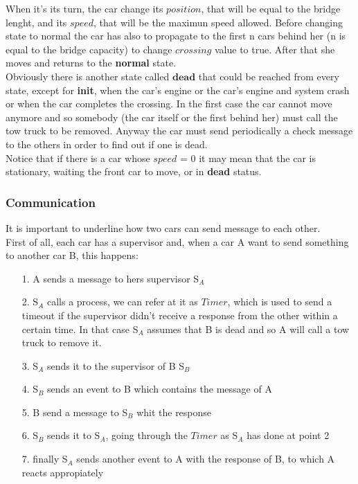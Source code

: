 When it's its turn, the car change its $position$, that will be equal to the bridge lenght, and its $speed$,
that will be the maximun speed allowed. Before changing state to normal the car has also to propagate to the first n cars behind her (n is equal to the bridge capacity) 
to change $crossing$ value to true. After that she moves and returns to the \textbf{normal} state.\\
Obviously there is another state called $\textbf{dead}$ that could be reached from every state, except for \textbf{init}, 
when the car's engine or the car's engine and system crash or when the car completes the crossing. 
In the first case the car cannot move anymore and so somebody (the car itself or the first behind her)
 must call the tow truck to be removed. Anyway the car must send periodically a check message to the others
in order to find out if one is dead. \\Notice that if there is a car whose $speed$ = 0 it may mean that the car is stationary, waiting the front
 car to move, or in \textbf{dead} status.\\

\subsubsection{Communication}

It is important to underline how two cars can send message to each other. \\
First of all, each car has a supervisor and, when a car A want to send something to another car B,
this happens:
\begin{itemize}
   \item[1.] A sends a message to hers supervisor S$_{A}$
   \item [2.] S$_{A}$ calls a process, we can refer at it as $Timer$, which is used to send a timeout
   if the supervisor didn't receive a response from the other within a certain time. In that case S$_{A}$ assumes 
   that B is dead and so A will call a tow truck to remove it.
   \item[3.] S$_{A}$ sends it to the supervisor of B S$_{B}$
   \item [4.] S$_{B}$ sends an event to B which contains the message of A
   \item [5.] B send a message to S$_{B}$ whit the response
   \item [6.] S$_{B}$ sends it to S$_{A}$, going through the $Timer$ as S$_{A}$ has done at point 2
   \item [7.] finally S$_{A}$ sends another event to A with the response of B, to which A reacts appropiately
\end{itemize}

